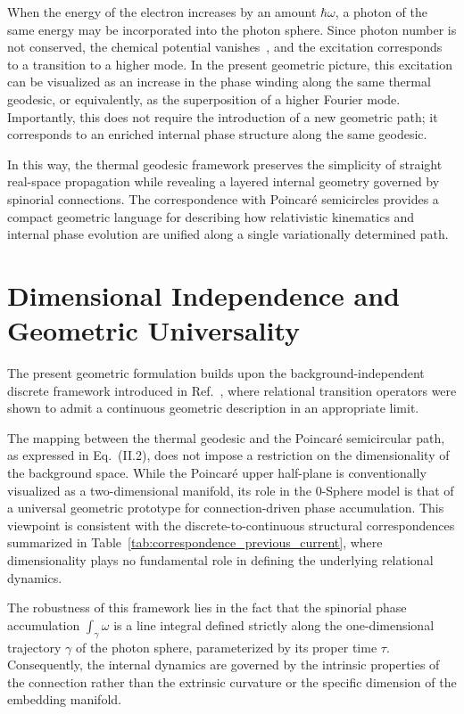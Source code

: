\documentclass[%
 reprint,
 amsmath,amssymb,
 aps,
 prb,
]{revtex4-2}
\numberwithin{equation}{section}
\begin{document}
When the energy of the electron increases by an amount $\hbar\omega$, a photon of the same energy may be incorporated into the photon sphere. Since photon number is not conserved, the chemical potential vanishes~\cite{hawking1975,unruh1976}, and the excitation corresponds to a transition to a higher mode. In the present geometric picture, this excitation can be visualized as an increase in the phase winding along the same thermal geodesic, or equivalently, as the superposition of a higher Fourier mode. Importantly, this does not require the introduction of a new geometric path; it corresponds to an enriched internal phase structure along the same geodesic.

In this way, the thermal geodesic framework preserves the simplicity of straight real-space propagation while revealing a layered internal geometry governed by spinorial connections. The correspondence with Poincaré semicircles provides a compact geometric language for describing how relativistic kinematics and internal phase evolution are unified along a single variationally determined path.


\section{Dimensional Independence and Geometric Universality}
\label{sec:dimensional_independence}

The present geometric formulation builds upon the background-independent discrete framework introduced in Ref.~\cite{hanamura17765336}, where relational transition operators were shown to admit a continuous geometric description in an appropriate limit.

The mapping between the thermal geodesic and the Poincaré semicircular path, as expressed in Eq.~(II.2), does not impose a restriction on the dimensionality of the background space. While the Poincaré upper half-plane is conventionally visualized as a two-dimensional manifold, its role in the 0-Sphere model is that of a universal geometric prototype for connection-driven phase accumulation. This viewpoint is consistent with the discrete-to-continuous structural correspondences summarized in Table~\ref{tab:correspondence_previous_current}, where dimensionality plays no fundamental role in defining the underlying relational dynamics.

The robustness of this framework lies in the fact that the spinorial phase accumulation $\int_{\gamma} \omega$ is a line integral defined strictly along the one-dimensional trajectory $\gamma$ of the photon sphere, parameterized by its proper time $\tau$. Consequently, the internal dynamics are governed by the intrinsic properties of the connection rather than the extrinsic curvature or the specific dimension of the embedding manifold.
\end{document}
